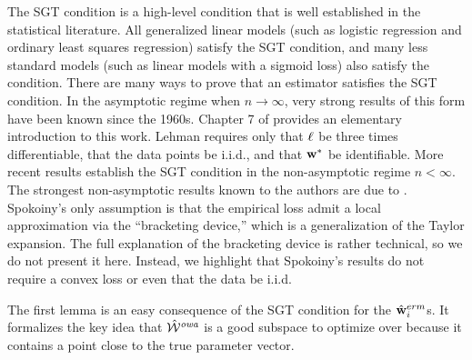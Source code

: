 \documentclass[thesis.tex]{subfiles}
\begin{document}

The SGT condition is a high-level condition that is well established in the statistical literature.
All generalized linear models (such as logistic regression and ordinary least squares regression) satisfy the SGT condition,
and many less standard models (such as linear models with a sigmoid loss) also satisfy the condition. 
There are many ways to prove that an estimator satisfies the SGT condition.
In the asymptotic regime when $n\to\infty$,
very strong results of this form have been known since the 1960s.
Chapter 7 of \citet{lehmann1999elements} provides an elementary introduction to this work.
Lehman requires only that $\ell$ be three times differentiable, that the data points be i.i.d., and that ${\mathbf w^{*}}$ be identifiable.
More recent results establish the SGT condition in the non-asymptotic regime $n<\infty$.
The strongest non-asymptotic results known to the authors are due to \citet{spokoiny2012parametricestimation}.
Spokoiny's only assumption is that the empirical loss admit a local approximation via the ``bracketing device,''
which is a generalization of the Taylor expansion.
The full explanation of the bracketing device is rather technical,
so we do not present it here.
Instead, we highlight that Spokoiny's results do not require a convex loss or even that the data be i.i.d. 

The first lemma is an easy consequence of the SGT condition for the $\hat{\mathbf w}^{erm}_i$s.
It formalizes the key idea that ${\hat {{\mathcal W}}^{\textit{owa}}}$ is a good subspace to optimize over because it contains a point close to the true parameter vector.
\end{document}
